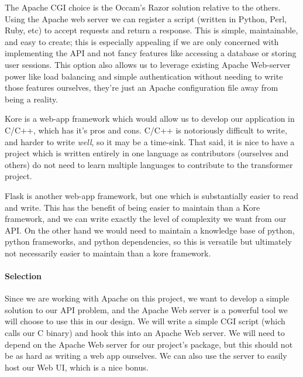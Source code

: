 The Apache CGI choice is the Occam's Razor solution relative to the others.
Using the Apache web server we can register a script (written in Python, Perl, Ruby, etc) to accept requests and return a response.
This is simple, maintainable, and easy to create; this is especially appealing if we are only concerned with implementing the API and not fancy features like accessing a database or storing user sessions.
This option also allows us to leverage existing Apache Web-server power like load balancing and simple authentication without needing to write those features ourselves, they're just an Apache configuration file away from being a reality.

Kore is a web-app framework which would allow us to develop our application in C/C++, which has it's pros and cons.
C/C++ is notoriously difficult to write, and harder to write \textit{well}, so it may be a time-sink.
That said, it is nice to have a project which is written entirely in one language as contributors (ourselves and others) do not need to learn multiple languages to contribute to the transformer project.

Flask is another web-app framework, but one which is substantially easier to read and write.
This has the benefit of being easier to maintain than a Kore framework, and we can write exactly the level of complexity we want from our API.
On the other hand we would need to maintain a knowledge base of python, python frameworks, and python dependencies, so this is versatile but ultimately not necessarily easier to maintain than a kore framework.

\paragraph{Selection}

Since we are working with Apache on this project, we want to develop a simple solution to our API problem, and the Apache Web server is a powerful tool we will choose to use this in our design.
We will write a simple CGI script (which calls our C binary) and hook this into an Apache Web server.
We will need to depend on the Apache Web server for our project's package, but this should not be as hard as writing a web app ourselves.
We can also use the server to easily host our Web UI, which is a nice bonus.

